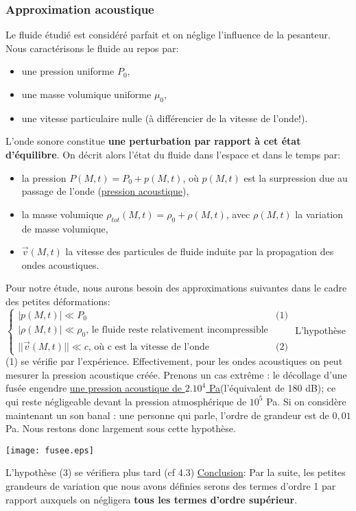 \documentclass[a4paper, 12pt]{article}
\begin{document}
\subsubsection{Approximation acoustique}
Le fluide étudié est considéré parfait et on néglige l'influence de la pesanteur.\newline
Nous caractérisons le fluide au repos par:
\begin{itemize}
\item une pression uniforme $P_0$,
\item une masse volumique uniforme $\mu_0$,
\item une vitesse particulaire nulle (à différencier de la vitesse de l'onde!).
\end{itemize}
L'onde sonore constitue \textbf{une perturbation par rapport à cet état d'équilibre}. On décrit alors l'état du fluide dans l'espace et dans le temps par:
\begin{itemize}
\item la pression $P(M,t)=P_0+p(M,t)$, où $p(M,t)$ est la surpression due au passage de l'onde (\underline{pression acoustique}),
\item la masse volumique $\rho_{tot}(M,t)=\rho_0+\rho(M,t)$, avec $\rho(M,t)$ la variation de masse volumique,
\item $\vec{v}(M,t)$ la vitesse des particules de fluide induite par la propagation des ondes acoustiques. \newline
\end{itemize}
Pour notre étude, nous aurons besoin des approximations suivantes dans le cadre des petites déformations:$\begin{cases}
|p(M,t)|\ll P_0 &\text{(1)}\\
|\rho(M,t)|\ll \rho_0 \text{, le fluide reste relativement incompressible} \\
||\vec{v}(M,t)||\ll c \text{, où c est la vitesse de l'onde} &\text{(2)}
\end{cases}$\newline \newline \newline
L'hypothèse (1) se vérifie par l'expérience. Effectivement, pour les ondes acoustiques on peut mesurer la pression acoustique créée. Prenons un cas extrême : le décollage d'une fusée engendre {\textcolor{blue}{\href{https://fr.wikipedia.org/wiki/Comparaison_du_volume_de_sources_courantes_de_bruit}{une pression acoustique de $2.10^4$ Pa}}}(l'équivalent de 180 dB); ce qui reste négligeable devant la pression atmosphérique de $10^5$ Pa. Si on considère maintenant un son banal : une personne qui parle, l'ordre de grandeur est de $0,01$ Pa. Nous restons donc largement sous cette hypothèse. \newline
\begin{center}
{\texttt{[image: fusee.eps]}}
\end{center}
L'hypothèse (3) se vérifiera plus tard (cf 4.3)\newline
\underline{Conclusion}: Par la suite, les petites grandeurs de variation que nous avons définies serons des termes d'ordre 1 par rapport auxquels on négligera \textbf{tous les termes d'ordre supérieur}.
\end{document}
